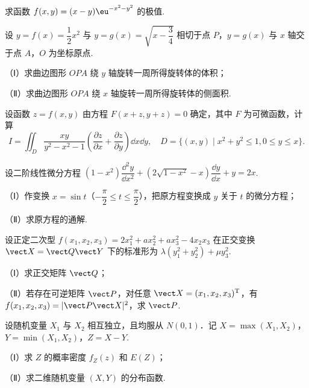 \begin{question}[index=17,points=10]
求函数 $f(x,y)=(x-y)\eu^{-x^2-y^2}$ 的极值.
\end{question}
\QuestionBreak\WorkSpace

\begin{question}[index=18,points=12]
设 $y=f(x)=\dfrac12x^2$ 与 $y=g(x)=\sqrt{x-\dfrac34}$ 相切于点 $P$，$y=g(x)$ 与 $x$ 轴交于点 $A$，$O$ 为坐标原点.
\par（Ⅰ）求曲边图形 $OPA$ 绕 $y$ 轴旋转一周所得旋转体的体积；
\par（Ⅱ）求曲边图形 $OPA$ 绕 $x$ 轴旋转一周所得旋转体的侧面积.
\end{question}
\QuestionBreak\WorkSpace\WorkPageBreak

\begin{question}[index=19,points=12]
设函数 $z=f(x,y)$ 由方程 $F(x+z,y+z)=0$ 确定，其中 $F$ 为可微函数，计算
\[I=\iint_D\frac{xy}{y^2-x^2-1}\left(\frac{\partial z}{\partial x}+\frac{\partial z}{\partial y}\right)\dd x\dd y,\quad D=\{(x,y)\mid x^2+y^2\le1,0\le y\le x\}.\]
\end{question}
\QuestionBreak\WorkSpace

\begin{question}[index=20,points=12]
设二阶线性微分方程 $(1-x^2)\dfrac{\dd^2y}{\dd x^2}+(2\sqrt{1-x^2}-x)\dfrac{\dd y}{\dd x}+y=2x$.
\par（Ⅰ）作变换 $x=\sin t$（$-\dfrac\pi2\le t\le\dfrac\pi2$），把原方程变换成 $y$ 关于 $t$ 的微分方程；
\par（Ⅱ）求原方程的通解.
\end{question}
\QuestionBreak\WorkSpace\WorkPageBreak

\begin{question}[index=21,points=12]
设正定二次型 $f(x_1,x_2,x_3)=2x_1^2+ax_2^2+ax_3^2-4x_2x_3$ 在正交变换 $\vect X=\vect Q\vect Y$ 下的标准形为 $\lambda(y_1^2+y_2^2)+\mu y_3^2$.
\par（Ⅰ）求正交矩阵 $\vect Q$；
\par（Ⅱ）若存在可逆矩阵 $\vect P$，对任意 $\vect X=(x_1,x_2,x_3)^{\mathrm T}$，有 $f(x_1,x_2,x_3)=|\vect P\vect X|^2$，求 $\vect P$.
\end{question}
\QuestionBreak\WorkSpace

\begin{question}[index=22,points=12]
设随机变量 $X_1$ 与 $X_2$ 相互独立，且均服从 $N(0,1)$．记 $X=\max(X_1,X_2)$，$Y=\min(X_1,X_2)$，$Z=X-Y$.
\par（Ⅰ）求 $Z$ 的概率密度 $f_Z(z)$ 和 $E(Z)$；
\par（Ⅱ）求二维随机变量 $(X,Y)$ 的分布函数.
\end{question}
\WorkSpace
